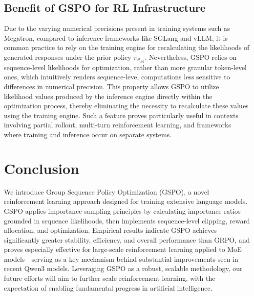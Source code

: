 \subsection{Benefit of GSPO for RL Infrastructure}

Due to the varying numerical precisions present in training systems such as Megatron, compared to inference frameworks like SGLang and vLLM, it is common practice to rely on the training engine for recalculating the likelihoods of generated responses under the prior policy $\pi_{\theta_\text{old}}$. Nevertheless, GSPO relies on sequence-level likelihoods for optimization, rather than more granular token-level ones, which intuitively renders sequence-level computations less sensitive to differences in numerical precision. This property allows GSPO to utilize likelihood values produced by the inference engine directly within the optimization process, thereby eliminating the necessity to recalculate these values using the training engine. Such a feature proves particularly useful in contexts involving partial rollout, multi-turn reinforcement learning, and frameworks where training and inference occur on separate systems.

\section{Conclusion}

We introduce Group Sequence Policy Optimization (GSPO), a novel reinforcement learning approach designed for training extensive language models. GSPO applies importance sampling principles by calculating importance ratios grounded in sequence likelihoods, then implements sequence-level clipping, reward allocation, and optimization. Empirical results indicate GSPO achieves significantly greater stability, efficiency, and overall performance than GRPO, and proves especially effective for large-scale reinforcement learning applied to MoE models—serving as a key mechanism behind substantial improvements seen in recent Qwen3 models. Leveraging GSPO as a robust, scalable methodology, our future efforts will aim to further scale reinforcement learning, with the expectation of enabling fundamental progress in artificial intelligence.

